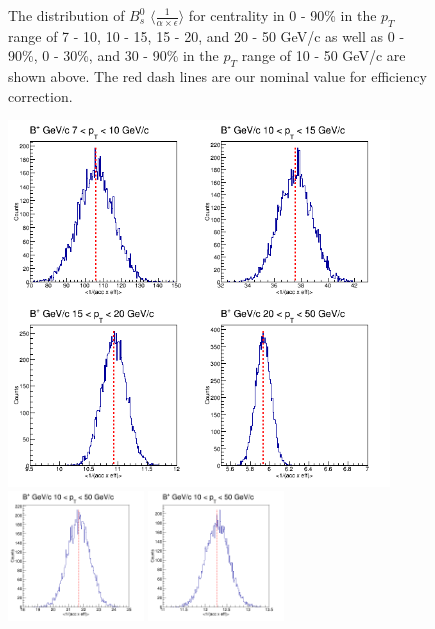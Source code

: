 \begin{figure}[h]
\begin{center}
\caption{The distribution of $B^0_s$ $\langle \frac{1}{\alpha \times \epsilon} \rangle$ for centrality in 0 - 90\% in the $p_T$ range of 7 - 10, 10 - 15, 15 - 20, and 20 - 50 GeV/c as well as 0 - 90\%, 0 - 30\%, and 30 - 90\% in the $p_T$ range of 10 - 50 GeV/c are shown above. The red dash lines are our nominal value for efficiency correction.}
\label{BsEffStatSyst}
\end{center}
\end{figure}


\begin{figure}[h]
\begin{center}
\includegraphics[width= 0.90\textwidth]{Figures/Chapter5/BPStatSyst_0_90_4BinsPT.png}
\includegraphics[width= 0.32\textwidth]{Figures/Chapter5/BPStatSyst_0_30_1BinsPT.png}
\includegraphics[width= 0.32\textwidth]{Figures/Chapter5/BPStatSyst_30_90_1BinsPT.png}

\end{center}
\end{figure}
